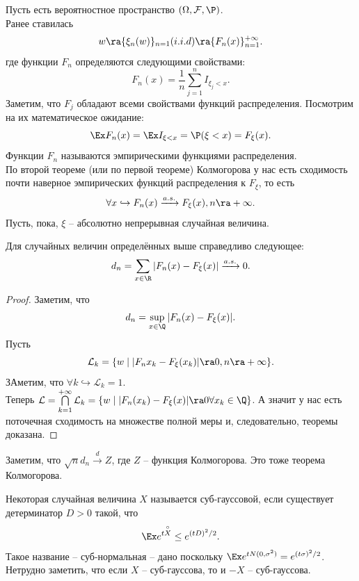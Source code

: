 Пусть есть вероятностное пространство $(\Omega, \mathcal{F}, \P)$. \\
Ранее ставилась
\[
    w \ra \{\xi_n(w)\}_{n = 1} (i.i.d) \ra \{ F_{n}(x )\}_{n = 1}^{+\infty}.
\]
где функции $F_n$ определяются следующими свойствами:
\[
    F_{n}(x) = \dfrac{1}{n} \sum\limits_{j = 1}^{n} I_{\xi_j < x}.
\]
Заметим, что $F_j$ обладают всеми свойствами функций распределения.
Посмотрим на их математическое ожидание:
\[
    \Ex F_n(x) = \Ex I_{\xi < x} = \P(\xi < x) = F_{\xi}(x).
\]
Функции $F_{n}$ называются эмпирическими функциями распределения. \\
По второй теореме (или по первой теореме) Колмогорова у нас есть сходимость почти наверное эмпирических функций распределения к $F_{\xi}$, то есть
\[
    \forall x \hookrightarrow F_{n}(x) \xrightarrow{a.s.} F_{\xi}(x), n \ra +\infty.
\]
Пусть, пока, $\xi$ -- абсолютно непрерывная случайная величина.
\begin{theorem}
    Для случайных величин определённых выше справедливо следующее:
    \[
        d_n = \sum\limits_{x \in \R} |F_{n}(x) - F_{\xi}(x)| \xrightarrow{a.s.} 0.
    \]
\end{theorem}
\begin{proof}
    Заметим, что
    \[
        d_n = \sup\limits_{x \in \Q}|F_{n}(x) - F_{\xi}(x)|.
    \]
    Пусть
    \[
        \mathcal{L}_k = \{w \mid |F_n{x_k} - F_{\xi}(x_k)| \ra 0, n \ra +\infty\}.
    \]
    ЗАметим, что $\forall k \hookrightarrow \mathcal{L}_k = 1$. \\
    Теперь $\mathcal{L} = \bigcap\limits_{k = 1}^{+\infty} \mathcal{L}_k = \{w \mid |F_{n}(x_k) - F_{\xi}(x)| \ra 0 \forall x_k \in \Q\}$.
    А значит у нас есть поточечная сходимость на множестве полной меры и, следовательно, теоремы доказана.
\end{proof}
Заметим, что $\sqrt {n}d_n \xrightarrow{d} Z$, где $Z$ -- функция Колмогорова. Это тоже теорема Колмогорова. \\
\begin{definition}
    Некоторая случайная величина $X$ называется суб-гауссовой, если существует детерминатор $D > 0$ такой, что
    \[
        \Ex e^{t \overset{\circ}{X}} \leq e^{(tD)^2/2}.
    \]
    Такое название -- суб-нормальная -- дано поскольку $\Ex e^{t N(0, \sigma^2)} = e^{(t\sigma)^2/2}$. \\
    Нетрудно заметить, что если $X$ -- суб-гауссова, то и $-X$ -- суб-гауссова.
\end{definition}
